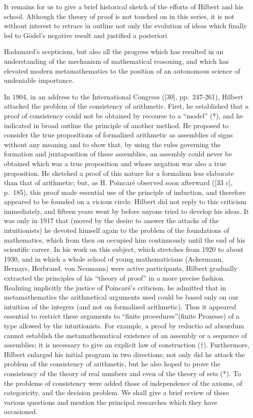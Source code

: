 It remains for us to give a brief historical sketch of the efforts of Hilbert and his school. Although the theory of proof is not touched on in this series, it is not without interest to retrace in outline not only the evolution of ideas which finally led to Gödel's negative result and justified a posteriori

Hadamard's scepticism, but also all the progress which has resulted in an understanding of the mechanism of mathematical reasoning, and which has elevated modern metamathematics to the position of an autonomous science of undeniable importance.

In 1904, in an address to the International Congress ({[}30{]}, pp.~247-261), Hilbert attacked the problem of the consistency of arithmetic. First, he established that a proof of consistency could not be obtained by recourse to a ``model'' (*), and he indicated in broad outline the principle of another method. He proposed to consider the true propositions of formalized arithmetic as assemblies of signs without any meaning and to show that, by using the rules governing the formation and juxtaposition of these assemblies, an assembly could never be obtained which was a true proposition and whose negation was also a true proposition. He sketched a proof of this nature for a formalism less elaborate than that of arithmetic; but, as H. Poincaré observed soon afterward ({[}33 c{]}, p.~185), this proof made essential use of the principle of induction, and therefore appeared to be founded on a vicious circle. Hilbert did not reply to this criticism immediately, and fifteen years went by before anyone tried to develop his ideas. It was only in 1917 that (moved by the desire to answer the attacks of the intuitionists) he devoted himself again to the problem of the foundations of mathematics, which from then on occupied him continuously until the end of his scientific career. In his work on this subject, which stretches from 1920 to about 1930, and in which a whole school of young mathematicians (Ackermann, Bernays, Herbrand, von Neumann) were active participants, Hilbert gradually extracted the principles of his ``theory of proof'' in a more precise fashion. Realizing implicitly the justice of Poincaré's criticism, he admitted that in metamathematics the arithmetical arguments used could be based only on our intuition of the integers (and not on formalized arithmetic). Thus it appeared essential to restrict these arguments to ``finite procedures''(finite Prozesse) of a type allowed by the intuitionists. For example, a proof by reductio ad absurdum cannot establish the metamathematical existence of an assembly or a sequence of assemblies; it is necessary to give an explicit law of construction (†). Furthermore, Hilbert enlarged his initial program in two directions; not only did he attack the problem of the consistency of arithmetic, but he also hoped to prove the consistency of the theory of real numbers and even of the theory of sets (*). To the problems of consistency were added those of independence of the axioms, of categoricity, and the decision problem. We shall give a brief review of these various questions and mention the principal researches which they have occasioned.

